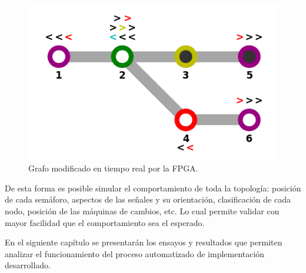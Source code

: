 		\begin{figure}[h]
		\centering
		\includegraphics[scale=.76]{./Figures/Mapa_interfaz}
			\caption{Grafo modificado en tiempo real por la FPGA.}
			\label{fig:Grafo_UART}
		\end{figure}

	De esta forma es posible simular el comportamiento de toda la topología: posición de cada semáforo, aspectos de las señales y su orientación, clasificación de cada nodo, posición de las máquinas de cambios, etc. Lo cual permite validar con mayor facilidad que el comportamiento sea el esperado.

	En el siguiente capítulo se presentarán los ensayos y resultados que permiten analizar el funcionamiento del proceso automatizado de implementación desarrollado.
